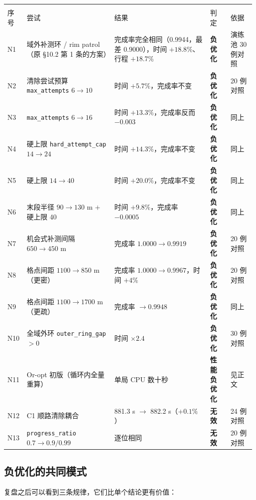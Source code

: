 \footnotesize
\begin{longtable}{p{0.6cm}p{3.4cm}p{3.1cm}p{3.0cm}p{2.4cm}}
\toprule
\\序号 & 尝试 & 结果 & 判定 & 依据 \\ \midrule
\endhead
N1 & 域外补测环 / rim patrol（原 §10.2 第 1 条的方案） &
完成率完全相同（0.9944，最差 0.9000），时间 $+18.8\%$、行程 $+18.7\%$ &
\textbf{负优化} & 演练池 30 例对照 \\
N2 & 清除尝试预算 \texttt{max\_attempts} $6\to10$ & 时间 $+5.7\%$，完成率不变 & \textbf{负优化} & 20 例对照 \\
N3 & \texttt{max\_attempts} $6\to16$ & 时间 $+13.3\%$，完成率反而 $-0.003$ & \textbf{负优化} & 同上 \\
N4 & 硬上限 \texttt{hard\_attempt\_cap} $14\to24$ & 时间 $+14.3\%$，完成率不变 & \textbf{负优化} & 同上 \\
N5 & 硬上限 $14\to40$ & 时间 $+20.0\%$，完成率不变 & \textbf{负优化} & 同上 \\
N6 & 末段半径 $90\to130$ m $+$ 硬上限 40 & 时间 $+9.8\%$，完成率 $-0.0005$ & \textbf{负优化} & 同上 \\
N7 & 机会式补测间隔 $650\to450$ m & 完成率 $1.0000\to0.9919$ & \textbf{负优化} & 20 例对照 \\
N8 & 格点间距 $1100\to850$ m（更密） & 完成率 $1.0000\to0.9967$，时间 $+4\%$ & \textbf{负优化} & 20 例对照 \\
N9 & 格点间距 $1100\to1700$ m（更疏） & 完成率 $\to0.9948$ & \textbf{负优化} & 同上 \\
N10 & 全域外环 \texttt{outer\_ring\_gap}$>0$ & 时间 $\times2.4$ & \textbf{负优化} & 30 例对照 \\
N11 & Or-opt 初版（循环内全量重算） & 单局 CPU 数十秒 & \textbf{性能负优化} & 见正文 \\
N12 & C1 顺路清除耦合 & 881.3 s $\to$ 882.2 s（$+0.1\%$） & \textbf{无效} & 24 例对照 \\
N13 & \texttt{progress\_ratio} $0.7\to0.9/0.99$ & 逐位相同 & \textbf{无效} & 20 例对照 \\
\bottomrule
\end{longtable}

\subsection{负优化的共同模式}

复盘之后可以看到三条规律，它们比单个结论更有价值：

